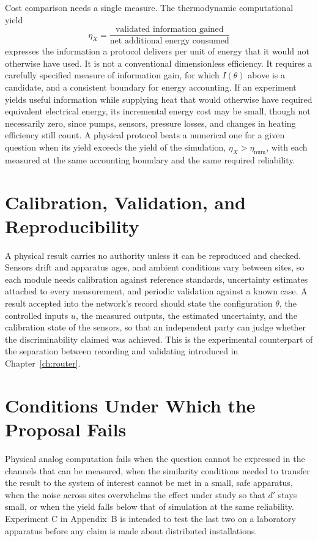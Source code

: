 Cost comparison needs a single measure. The thermodynamic computational yield
\[
\eta_X=\frac{\text{validated information gained}}{\text{net additional energy consumed}}
\]
expresses the information a protocol delivers per unit of energy that it would not otherwise have used. It is not a conventional dimensionless efficiency. It requires a carefully specified measure of information gain, for which $I(\theta)$ above is a candidate, and a consistent boundary for energy accounting. If an experiment yields useful information while supplying heat that would otherwise have required equivalent electrical energy, its incremental energy cost may be small, though not necessarily zero, since pumps, sensors, pressure losses, and changes in heating efficiency still count. A physical protocol beats a numerical one for a given question when its yield exceeds the yield of the simulation, $\eta_X>\eta_{\mathrm{num}}$, with each measured at the same accounting boundary and the same required reliability.

\section{Calibration, Validation, and Reproducibility}

A physical result carries no authority unless it can be reproduced and checked. Sensors drift and apparatus ages, and ambient conditions vary between sites, so each module needs calibration against reference standards, uncertainty estimates attached to every measurement, and periodic validation against a known case. A result accepted into the network's record should state the configuration $\theta$, the controlled inputs $u$, the measured outputs, the estimated uncertainty, and the calibration state of the sensors, so that an independent party can judge whether the discriminability claimed was achieved. This is the experimental counterpart of the separation between recording and validating introduced in Chapter~\ref{ch:router}.

\section{Conditions Under Which the Proposal Fails}

Physical analog computation fails when the question cannot be expressed in the channels that can be measured, when the similarity conditions needed to transfer the result to the system of interest cannot be met in a small, safe apparatus, when the noise across sites overwhelms the effect under study so that $d'$ stays small, or when the yield falls below that of simulation at the same reliability. Experiment C in Appendix~B is intended to test the last two on a laboratory apparatus before any claim is made about distributed installations.

